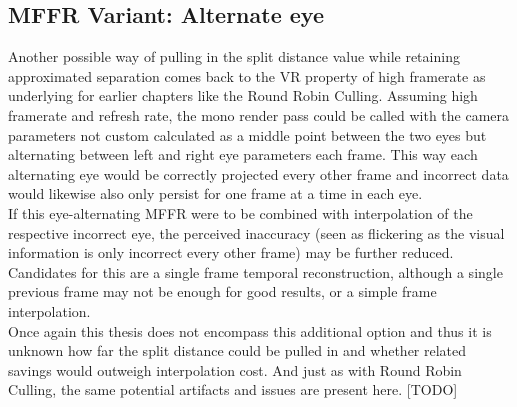 \subsection{MFFR Variant: Alternate eye}
Another possible way of pulling in the split distance value while retaining approximated separation comes back to the VR property of high framerate as underlying for earlier chapters like the Round Robin Culling. 
Assuming high framerate and refresh rate, the mono render pass could be called with the camera parameters not custom calculated as a middle point between the two eyes but alternating between left and right eye parameters each frame. This way each alternating eye would be correctly projected every other frame and incorrect data would likewise also only persist for one frame at a time in each eye. \\
If this eye-alternating MFFR were to be combined with interpolation of the respective incorrect eye, the perceived inaccuracy (seen as flickering as the visual information is only incorrect every other frame) may be further reduced. Candidates for this are a single frame temporal reconstruction, although a single previous frame may not be enough for good results, or a simple frame interpolation. \\
Once again this thesis does not encompass this additional option and thus it is unknown how far the split distance could be pulled in and whether related savings would outweigh interpolation cost. And just as with Round Robin Culling, the same potential artifacts and issues are present here. [TODO]
